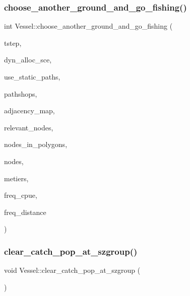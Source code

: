 \subsubsection{\texorpdfstring{choose\_another\_ground\_and\_go\_fishing()}{choose\_another\_ground\_and\_go\_fishing()}}
{\footnotesize\ttfamily int Vessel\+::choose\+\_\+another\+\_\+ground\+\_\+and\+\_\+go\+\_\+fishing (\begin{DoxyParamCaption}\item[{int}]{tstep,  }\item[{const \mbox{\hyperlink{class_dyn_alloc_options}{Dyn\+Alloc\+Options}} \&}]{dyn\+\_\+alloc\+\_\+sce,  }\item[{int}]{use\+\_\+static\+\_\+paths,  }\item[{const std\+::vector$<$ \mbox{\hyperlink{class_path_shop}{Path\+Shop}} $>$ \&}]{pathshops,  }\item[{\mbox{\hyperlink{myutils_8h_ae689dbcb43e66abf9a513718b83bd87d}{adjacency\+\_\+map\+\_\+t}} \&}]{adjacency\+\_\+map,  }\item[{vector$<$ \mbox{\hyperlink{classtypes_1_1_node_id}{types\+::\+Node\+Id}} $>$ \&}]{relevant\+\_\+nodes,  }\item[{const std\+::multimap$<$ int, int $>$ \&}]{nodes\+\_\+in\+\_\+polygons,  }\item[{std\+::vector$<$ \mbox{\hyperlink{class_node}{Node}} $\ast$ $>$ \&}]{nodes,  }\item[{std\+::vector$<$ \mbox{\hyperlink{class_metier}{Metier}} $\ast$ $>$ \&}]{metiers,  }\item[{std\+::ofstream \&}]{freq\+\_\+cpue,  }\item[{std\+::ofstream \&}]{freq\+\_\+distance }\end{DoxyParamCaption})}

\mbox{\label{class_vessel_aa85be09ec6d60f86e98a5bc7a809ebea}} 
\subsubsection{\texorpdfstring{clear\_catch\_pop\_at\_szgroup()}{clear\_catch\_pop\_at\_szgroup()}}
{\footnotesize\ttfamily void Vessel\+::clear\+\_\+catch\+\_\+pop\+\_\+at\+\_\+szgroup (\begin{DoxyParamCaption}{ }\end{DoxyParamCaption})}

